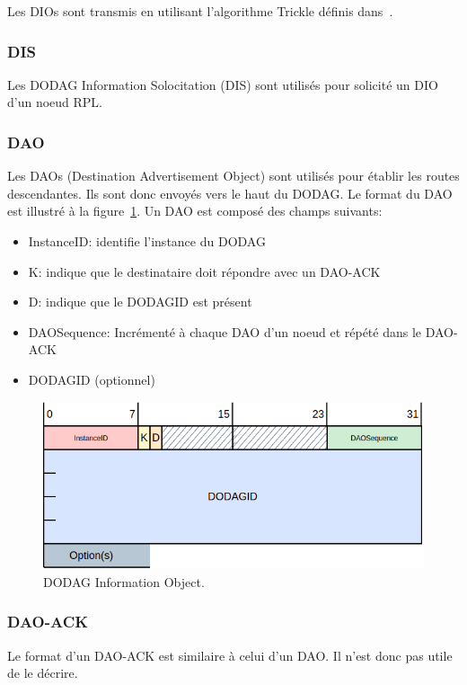     Les DIOs sont transmis en utilisant l'algorithme Trickle définis dans~\cite{rfc:trickle}.

\subsubsection*{DIS}
    Les DODAG Information Solocitation (DIS) sont utilisés pour solicité un DIO d'un noeud RPL.

\subsubsection*{DAO}%
    Les DAOs (Destination Advertisement Object) sont utilisés pour établir les routes descendantes.
    Ils sont donc envoyés vers le haut du DODAG. Le format du DAO est illustré à la figure~\ref{fig:state-dao}. Un DAO est composé des champs suivants:
    \begin{itemize}
        \item InstanceID: identifie l'instance du DODAG
        \item K: indique que le destinataire doit répondre avec un DAO-ACK
        \item D: indique que le DODAGID est présent
        \item DAOSequence: Incrémenté à chaque DAO d'un noeud et répété dans le DAO-ACK
        \item DODAGID (optionnel)
    \end{itemize}
    \begin{figure}[H]
        \centering
        \includegraphics[scale=0.5]{res/pictures/dao.drawio.png}
        \caption{DODAG Information Object.}
        \label{fig:state-dao}
    \end{figure}

\subsubsection*{DAO-ACK}
    Le format d'un DAO-ACK est similaire à celui d'un DAO. Il n'est donc pas utile de le décrire.


